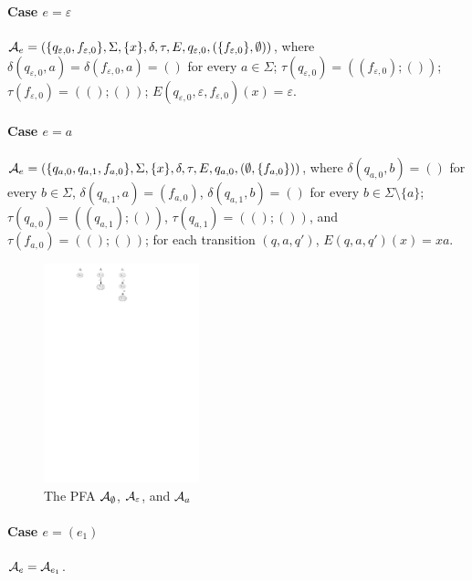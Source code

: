 \paragraph{Case $e = \varepsilon$} $\mathcal{A}_e = (\{q_{\varepsilon, 0}, f_{\varepsilon,0}\}, \Sigma, \{x \}, \delta, \tau, E, q_{\varepsilon,0}, (\{f_{\varepsilon,0}\}, \emptyset))$, 
%
where $\delta(q_{\varepsilon,0}, a) = \delta(f_{\varepsilon,0}, a) = ()$ for every $a \in \Sigma$; $\tau(q_{\varepsilon,0}) = ((f_{\varepsilon,0}); ())$;  $\tau(f_{\varepsilon,0}) = ((); ())$; %
$E(q_{\varepsilon,0}, \varepsilon, f_{\varepsilon,0})(x) = \varepsilon$.
		
\paragraph{Case $e = a$} $\mathcal{A}_e = (\{q_{a,0}, q_{a,1}, f_{a,0}\}, \Sigma, \{x\}, \delta, \tau, E, q_{a,0}, (\emptyset, \{f_{a,0}\}))$, where 
$\delta(q_{a,0}, b) = ()$ for every $b \in \Sigma$, $\delta(q_{a,1}, a) = (f_{a,0})$, $\delta(q_{a,1}, b) = ()$ for every $b \in \Sigma \setminus \{a\}$; 
%
$\tau(q_{a,0}) = ((q_{a,1}); ())$, $\tau(q_{a,1}) = ((); ())$, and $\tau(f_{a,0}) = ((); ())$; 
%
for each transition $(q, a, q')$, $E(q,a,q')(x) =xa$.
%		
\begin{figure}[ht]
			\centering
			\includegraphics[width = 0.4\textwidth]{reg2pfa-0.pdf}
			\caption{The PFA $\mathcal{A}_{\emptyset}$, $\mathcal{A}_{\varepsilon}$, and $\mathcal{A}_{a}$ }
			\label{fig-reg2pfa-0}
\end{figure}  

		
\paragraph{Case $e = (e_1)$} $\mathcal{A}_e = \mathcal{A}_{e_1}$.
		

